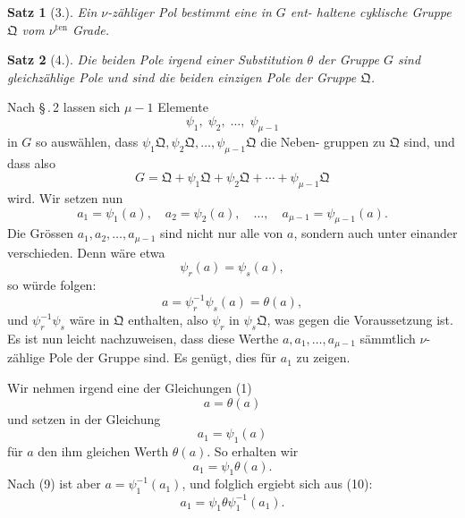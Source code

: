 \documentclass[12pt,a4paper]{article}
\theoremstyle{plain}
\newtheorem{satz}{Satz}[section]
\theoremstyle{definition}
\theoremstyle{remark}
\begin{document}
\begin{satz}[3.]
Ein $\nu$-z\"ahliger Pol bestimmt eine in $G$ ent-
haltene cyklische Gruppe $\mathfrak{Q}$ vom $\nu^{\text{ten}}$ Grade.
\end{satz}

\begin{satz}[4.]
Die beiden Pole irgend einer Substitution $\theta$ der
Gruppe $G$ sind gleichz\"ahlige Pole und sind die
beiden einzigen Pole der Gruppe $\mathfrak{Q}$.
\end{satz}

Nach \S\,.\,2 lassen sich $\mu-1$ Elemente
\begin{equation}\label{eq:52_5}
\psi_1,\; \psi_2,\; \ldots,\; \psi_{\mu-1}\tag{5}
\end{equation}
in $G$ so ausw\"ahlen, dass $\psi_1\mathfrak{Q}, \psi_2\mathfrak{Q}, \ldots, \psi_{\mu-1}\mathfrak{Q}$ die Neben-
gruppen zu $\mathfrak{Q}$ sind, und dass also
\begin{equation}\label{eq:52_6}
G = \mathfrak{Q} + \psi_1\mathfrak{Q} + \psi_2\mathfrak{Q} + \cdots + \psi_{\mu-1}\mathfrak{Q}\tag{6}
\end{equation}
wird. Wir setzen nun
\begin{equation}\label{eq:52_7}
a_1 = \psi_1(a),\quad a_2 = \psi_2(a),\quad \ldots,\quad a_{\mu-1} = \psi_{\mu-1}(a).\tag{7}
\end{equation}
Die Gr\"ossen $a_1, a_2, \ldots, a_{\mu-1}$ sind nicht nur alle von $a$,
sondern auch unter einander verschieden. Denn w\"are etwa
\[
\psi_r(a) = \psi_s(a),
\]
so w\"urde folgen:
\[
a = \psi_r^{-1}\psi_s(a) = \theta(a),
\]
und $\psi_r^{-1}\psi_s$ w\"are in $\mathfrak{Q}$ enthalten, also $\psi_r$ in $\psi_s\mathfrak{Q}$, was gegen die
Voraussetzung ist. Es ist nun leicht nachzuweisen, dass diese
Werthe $a, a_1, \ldots, a_{\mu-1}$ s\"ammtlich $\nu$-z\"ahlige Pole der Gruppe
sind. Es gen\"ugt, dies f\"ur $a_1$ zu zeigen.

Wir nehmen irgend eine der Gleichungen (1)
\begin{equation}\label{eq:52_8}
a = \theta(a)\tag{8}
\end{equation}
und setzen in der Gleichung
\begin{equation}\label{eq:52_9}
a_1 = \psi_1(a)\tag{9}
\end{equation}
f\"ur $a$ den ihm gleichen Werth $\theta(a)$. So erhalten wir
\begin{equation}\label{eq:52_10}
a_1 = \psi_1\theta(a).\tag{10}
\end{equation}
Nach (9) ist aber $a = \psi_1^{-1}(a_1)$, und folglich ergiebt sich
aus (10):
\begin{equation}\label{eq:52_11}
a_1 = \psi_1\theta\psi_1^{-1}(a_1).\tag{11}
\end{equation}
\end{document}
